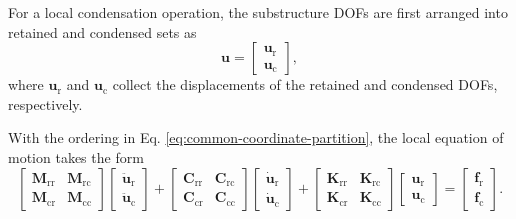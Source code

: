 \documentclass[11pt,a4paper]{article}
\numberwithin{equation}{section}
\begin{document}
For a local condensation operation, the substructure DOFs are first arranged into retained and condensed sets as
\begin{equation}
	\bm{u}=
	\begin{bmatrix}
		\bm{u}_{\mathrm{r}}\\
		\bm{u}_{\mathrm{c}}
	\end{bmatrix},
	\label{eq:common-coordinate-partition}
\end{equation}
where \(\bm{u}_{\mathrm{r}}\) and \(\bm{u}_{\mathrm{c}}\) collect the displacements of the retained and condensed DOFs, respectively.

With the ordering in Eq. \eqref{eq:common-coordinate-partition}, the local equation of motion takes the form
\begin{equation}
	\begin{bmatrix}
		\mathbf{M}_{\mathrm{rr}} & \mathbf{M}_{\mathrm{rc}}\\
		\mathbf{M}_{\mathrm{cr}} & \mathbf{M}_{\mathrm{cc}}
	\end{bmatrix}
	\begin{bmatrix}
		\ddot{\bm{u}}_{\mathrm{r}}\\
		\ddot{\bm{u}}_{\mathrm{c}}
	\end{bmatrix}
	+
	\begin{bmatrix}
		\mathbf{C}_{\mathrm{rr}} & \mathbf{C}_{\mathrm{rc}}\\
		\mathbf{C}_{\mathrm{cr}} & \mathbf{C}_{\mathrm{cc}}
	\end{bmatrix}
	\begin{bmatrix}
		\dot{\bm{u}}_{\mathrm{r}}\\
		\dot{\bm{u}}_{\mathrm{c}}
	\end{bmatrix}
	+
	\begin{bmatrix}
		\mathbf{K}_{\mathrm{rr}} & \mathbf{K}_{\mathrm{rc}}\\
		\mathbf{K}_{\mathrm{cr}} & \mathbf{K}_{\mathrm{cc}}
	\end{bmatrix}
	\begin{bmatrix}
		\bm{u}_{\mathrm{r}}\\
		\bm{u}_{\mathrm{c}}
	\end{bmatrix}
	=
	\begin{bmatrix}
		\bm{f}_{\mathrm{r}}\\
		\bm{f}_{\mathrm{c}}
	\end{bmatrix}.
	\label{eq:partitioned-local-eom}
\end{equation}
\end{document}
